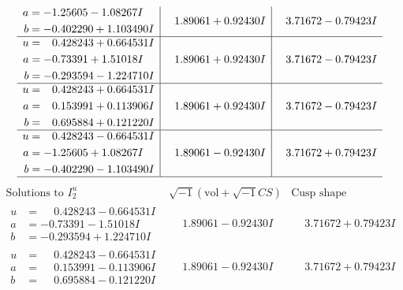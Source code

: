 \documentclass[1p]{elsarticle_modified}
\theoremstyle{definition}
\newcommand{\I}{\sqrt{-1}}
\begin{document}
$$\begin{array}{c|c|c}
\begin{aligned}
a &= -1.25605 - 1.08267 I \\
b &= -0.402290 + 1.103490 I\end{aligned}
 & \phantom{-}1.89061 + 0.92430 I & \phantom{-}3.71672 - 0.79423 I \\ \hline\begin{aligned}
u &= \phantom{-}0.428243 + 0.664531 I \\
a &= -0.73391 + 1.51018 I \\
b &= -0.293594 - 1.224710 I\end{aligned}
 & \phantom{-}1.89061 + 0.92430 I & \phantom{-}3.71672 - 0.79423 I \\ \hline\begin{aligned}
u &= \phantom{-}0.428243 + 0.664531 I \\
a &= \phantom{-}0.153991 + 0.113906 I \\
b &= \phantom{-}0.695884 + 0.121220 I\end{aligned}
 & \phantom{-}1.89061 + 0.92430 I & \phantom{-}3.71672 - 0.79423 I \\ \hline\begin{aligned}
u &= \phantom{-}0.428243 - 0.664531 I \\
a &= -1.25605 + 1.08267 I \\
b &= -0.402290 - 1.103490 I\end{aligned}
 & \phantom{-}1.89061 - 0.92430 I & \phantom{-}3.71672 + 0.79423 I\\
 \hline 
 \end{array}$$\newpage$$\begin{array}{c|c|c}  
\text{Solutions to }I^u_{2}& \I (\text{vol} + \sqrt{-1}CS) & \text{Cusp shape}\\
 \hline 
\begin{aligned}
u &= \phantom{-}0.428243 - 0.664531 I \\
a &= -0.73391 - 1.51018 I \\
b &= -0.293594 + 1.224710 I\end{aligned}
 & \phantom{-}1.89061 - 0.92430 I & \phantom{-}3.71672 + 0.79423 I \\ \hline\begin{aligned}
u &= \phantom{-}0.428243 - 0.664531 I \\
a &= \phantom{-}0.153991 - 0.113906 I \\
b &= \phantom{-}0.695884 - 0.121220 I\end{aligned}
 & \phantom{-}1.89061 - 0.92430 I & \phantom{-}3.71672 + 0.79423 I \\ \hline\begin{aligned}

\end{aligned}
\end{array}$$
\end{document}
